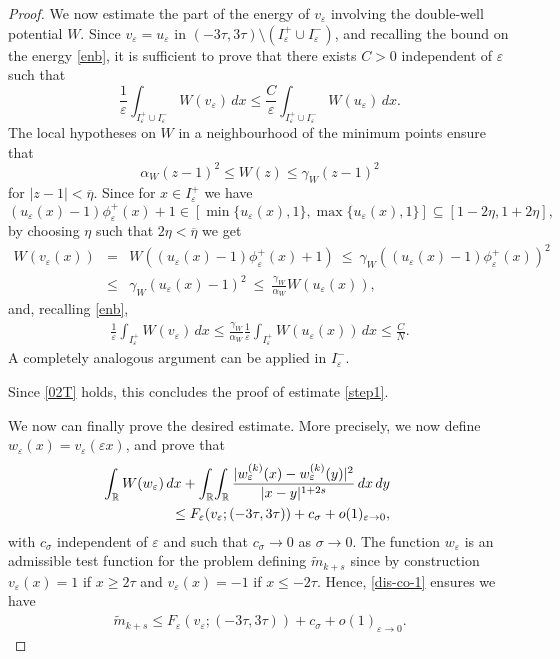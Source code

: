 \documentclass{article}
\newcommand{\e}{\varepsilon}
\begin{document}
\begin{proof}
We now 
estimate the part of the energy of $v_\e$ involving the double-well potential $W$. Since $v_\e=u_\e$ in $(-3\tau,3\tau)\setminus (I_\e^+\cup I_\e^-)$, and recalling the bound on the energy \eqref{enb}, it is sufficient to prove that  
there exists $C>0$ independent of $\e$ such that 
\begin{equation}\label{sW}
\frac{1}{\e}\int_{I_\e^+\cup I_\e^-}W(v_\e)\, dx\leq  \frac{C}{\e}\int_{I_\e^+\cup I_\e^-}W(u_\e)\, dx. 
\end{equation} 
The local hypotheses on $W$ in a neighbourhood of the minimum points ensure that 
$$\alpha_W (z-1)^2\leq W(z)\leq \gamma_W(z-1)^2$$  
for $|z-1|<\overline\eta$. 
Since for $x\in I_\e^+$ we have 
$$(u_\e(x)-1)\phi_\e^+(x)+1\in [\min\{u_\e(x),1\}, \max\{u_\e(x),1\}]\subseteq[1-2\eta,1+2\eta],$$ 
by choosing $\eta$ such that $2\eta<\overline\eta$ we get 
\begin{eqnarray*}
W(v_\e(x))&=&W((u_\e(x)-1)\phi_\e^+(x)+1)
\ \leq\ \gamma_W((u_\e(x)-1)\phi_\e^+(x))^2\\
&\leq& \gamma_W(u_\e(x)-1)^2 
\ \leq \ \frac{\gamma_W}{\alpha_W}W(u_\e(x)), 
\end{eqnarray*}
and, recalling \eqref{enb}, 
\begin{eqnarray*}
\frac{1}{\e}\int_{I_\e^+}W(v_\e)\, dx\leq\frac{\gamma_W}{\alpha_W}\frac{1}{\e}\int_{I_\e^+}W(u_\e(x))\, dx\leq \frac{C}{N}. 
\end{eqnarray*}
A completely analogous argument can be applied in $I_\e^-$.  

Since \eqref{02T} holds, this concludes the proof of estimate \eqref{step1}. 

\bigskip
{} 
We now can finally prove the desired estimate. More precisely, we now define $w_\e(x)=v_\e(\e x)$, and prove that 
\begin{eqnarray}\nonumber\label{dis-co-1}
&&\hspace{-1cm}\int_{\mathbb R} W(w_\e)\, dx+\int_{\mathbb R}\!\int_{\mathbb R} \frac{|w_\e^{(k)}(x)-w_\e^{(k)}(y)|^2}{|x-y|^{1+2s}}\, dx\, dy\\
&&\leq 
F_\e(v_\e;(-3\tau,3\tau))+c_\sigma+o(1)_{\e\to 0}, 
\end{eqnarray} 
with $c_\sigma$ independent of $\e$  and such that $c_\sigma\to 0$ as $\sigma\to 0$. 
The function $w_\e$ is an admissible test function for the problem defining $\widetilde m_{k+s}$ since by construction $v_\e(x)=1$ if $x\geq 2\tau$ and $v_\e(x)=-1$ if $x\leq -2\tau$. Hence, \eqref{dis-co-1} ensures we have   
\begin{eqnarray}\label{dis-co-2}
\widetilde m_{k+s} \leq F_\e(v_\e;(-3\tau,3\tau))+c_\sigma+o(1)_{\e\to 0}.  
\end{eqnarray} 



\end{proof}
\end{document}
